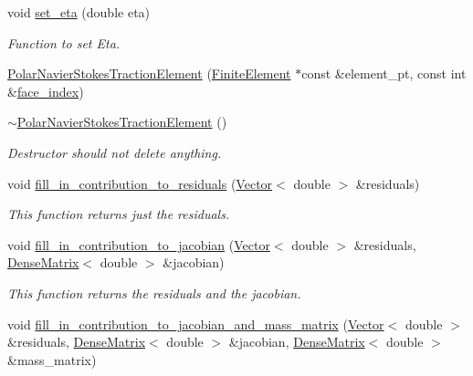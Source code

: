 \begin{DoxyCompactItemize}
void \hyperlink{classoomph_1_1PolarNavierStokesTractionElement_acf82a8786ed974bf6e3606b7c3f5ad8a}{set\+\_\+eta} (double eta)
\begin{DoxyCompactList}\small\item\em Function to set Eta. \end{DoxyCompactList}\item 
\hyperlink{classoomph_1_1PolarNavierStokesTractionElement_a4149e7be21b5028eb684db0488177f66}{Polar\+Navier\+Stokes\+Traction\+Element} (\hyperlink{classoomph_1_1FiniteElement}{Finite\+Element} $\ast$const \&element\+\_\+pt, const int \&\hyperlink{classoomph_1_1FaceElement_a478d577ac6db67ecc80f1f02ae3ab170}{face\+\_\+index})
\item 
\hyperlink{classoomph_1_1PolarNavierStokesTractionElement_a3ef9959b78ea2bea768f7c90ffae6e91}{$\sim$\+Polar\+Navier\+Stokes\+Traction\+Element} ()
\begin{DoxyCompactList}\small\item\em Destructor should not delete anything. \end{DoxyCompactList}\item 
void \hyperlink{classoomph_1_1PolarNavierStokesTractionElement_adedf328068563b40bf9b2a0cafcfe087}{fill\+\_\+in\+\_\+contribution\+\_\+to\+\_\+residuals} (\hyperlink{classoomph_1_1Vector}{Vector}$<$ double $>$ \&residuals)
\begin{DoxyCompactList}\small\item\em This function returns just the residuals. \end{DoxyCompactList}\item 
void \hyperlink{classoomph_1_1PolarNavierStokesTractionElement_a4a8aea8b8278cb407348de86309e5074}{fill\+\_\+in\+\_\+contribution\+\_\+to\+\_\+jacobian} (\hyperlink{classoomph_1_1Vector}{Vector}$<$ double $>$ \&residuals, \hyperlink{classoomph_1_1DenseMatrix}{Dense\+Matrix}$<$ double $>$ \&jacobian)
\begin{DoxyCompactList}\small\item\em This function returns the residuals and the jacobian. \end{DoxyCompactList}\item 
void \hyperlink{classoomph_1_1PolarNavierStokesTractionElement_ab3d5f0fb4c4a3c9330ce0b3d99efd321}{fill\+\_\+in\+\_\+contribution\+\_\+to\+\_\+jacobian\+\_\+and\+\_\+mass\+\_\+matrix} (\hyperlink{classoomph_1_1Vector}{Vector}$<$ double $>$ \&residuals, \hyperlink{classoomph_1_1DenseMatrix}{Dense\+Matrix}$<$ double $>$ \&jacobian, \hyperlink{classoomph_1_1DenseMatrix}{Dense\+Matrix}$<$ double $>$ \&mass\+\_\+matrix)

\end{DoxyCompactItemize}
